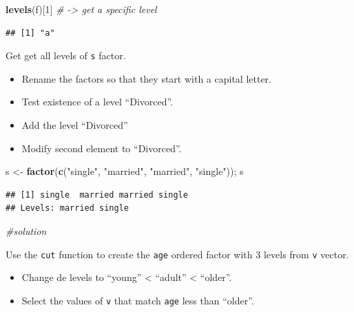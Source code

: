 \documentclass[
]{article}
\newenvironment{Shaded}{\begin{snugshade}}{\end{snugshade}}
\newcommand{\CommentTok}[1]{\textcolor[rgb]{0.56,0.35,0.01}{\textit{#1}}}
\newcommand{\DecValTok}[1]{\textcolor[rgb]{0.00,0.00,0.81}{#1}}
\newcommand{\KeywordTok}[1]{\textcolor[rgb]{0.13,0.29,0.53}{\textbf{#1}}}
\newcommand{\NormalTok}[1]{#1}
\newcommand{\StringTok}[1]{\textcolor[rgb]{0.31,0.60,0.02}{#1}}
\providecommand{\tightlist}{%
  \setlength{\itemsep}{0pt}\setlength{\parskip}{0pt}}
\begin{document}
\begin{Shaded}
\begin{Highlighting}[]
\KeywordTok{levels}\NormalTok{(f)[}\DecValTok{1}\NormalTok{] }\CommentTok{# -> get a specific level}
\end{Highlighting}
\end{Shaded}

\begin{verbatim}
## [1] "a"
\end{verbatim}

Get get all levels of \texttt{s} factor.

\begin{itemize}
\tightlist
\item
  Rename the factors so that they start with a capital letter.
\item
  Test existence of a level ``Divorced''.
\item
  Add the level ``Divorced''
\item
  Modify second element to ``Divorced''.
\end{itemize}

\begin{Shaded}
\begin{Highlighting}[]
\NormalTok{s <-}\StringTok{ }\KeywordTok{factor}\NormalTok{(}\KeywordTok{c}\NormalTok{(}\StringTok{"single"}\NormalTok{, }\StringTok{"married"}\NormalTok{, }\StringTok{"married"}\NormalTok{, }\StringTok{"single"}\NormalTok{));}
\NormalTok{s}
\end{Highlighting}
\end{Shaded}

\begin{verbatim}
## [1] single  married married single 
## Levels: married single
\end{verbatim}

\begin{Shaded}
\begin{Highlighting}[]
\CommentTok{#solution}
\end{Highlighting}
\end{Shaded}

Use the \texttt{cut} function to create the \texttt{age} ordered factor
with 3 levels from \texttt{v} vector.

\begin{itemize}
\tightlist
\item
  Change de levels to ``young'' \textless{} ``adult'' \textless{}
  ``older''.
\item
  Select the values of \texttt{v} that match \texttt{age} less than
  ``older''.
\end{itemize}
\end{document}
